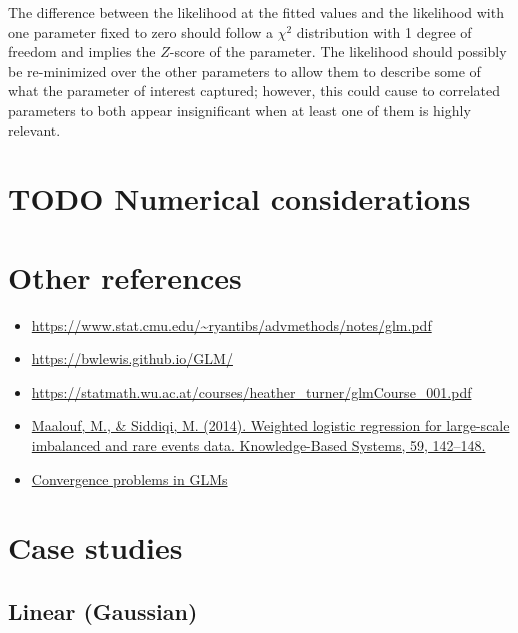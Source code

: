 \documentclass{article}
\begin{document}
The difference between the likelihood at the fitted values and the likelihood
with one parameter fixed to zero should follow a \(\chi^2\) distribution with
1 degree of freedom and implies the \(Z\)-score of the parameter. The
likelihood should possibly be re-minimized over the other parameters to allow
them to describe some of what the parameter of interest captured; however, this
could cause to correlated parameters to both appear insignificant when at least
one of them is highly relevant.


\section{TODO Numerical considerations}

\section{Other references}

\begin{itemize}
\item \url{https://www.stat.cmu.edu/~ryantibs/advmethods/notes/glm.pdf}
\item \url{https://bwlewis.github.io/GLM/}
\item \url{https://statmath.wu.ac.at/courses/heather_turner/glmCourse_001.pdf}
\item \href{https://doi.org/10.1016/j.knosys.2014.01.012}{Maalouf, M., \& Siddiqi, M. (2014). Weighted logistic regression for large-scale imbalanced and rare events data. Knowledge-Based Systems, 59, 142–148.}
\item \href{https://journal.r-project.org/archive/2011-2/RJournal_2011-2_Marschner.pdf}{Convergence problems in GLMs}
\end{itemize}

\section{Case studies}

\subsection{Linear (Gaussian)}
\end{document}

